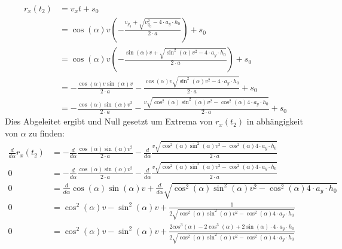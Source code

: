 \documentclass[sectionformat = aufgabe]{gadsescript}
\begin{document}
\begin{enumerate}[label=\alph*)]
		\begin{align*}
			r_x(t_2) &= v_xt + s_0\\
			~&= \cos(\alpha)v \left( - \frac{v_{y_0} + \sqrt{v_{y_0}^2 - 4\cdot a_y\cdot h_0}}{2\cdot a}\right) + s_0\\
			~&= \cos(\alpha)v \left( - \frac{\sin(\alpha)v+ \sqrt{\sin^2(\alpha)v^2 - 4\cdot a_y\cdot h_0}}{2\cdot a}\right) + s_0\\
			~&= - \frac{\cos(\alpha)v \sin(\alpha)v}{2\cdot a} - \frac{ \cos(\alpha)v \sqrt{\sin^2(\alpha)v^2 - 4\cdot a_y\cdot h_0}}{2\cdot a} + s_0\\
			~&= - \frac{\cos(\alpha)\sin(\alpha)v^2}{2\cdot a} - \frac{ v \sqrt{\cos^2(\alpha)\sin^2(\alpha)v^2 - \cos^2(\alpha)4\cdot a_y\cdot h_0}}{2\cdot a} + s_0
		\end{align*}
		Dies Abgeleitet ergibt und Null gesetzt um Extrema von $r_x(t_2)$ in abhängigkeit von $\alpha$ zu finden:
		\begin{align*}
			\frac{d}{d\alpha} r_x(t_2) &= -\frac{d}{d\alpha} \frac{\cos(\alpha)\sin(\alpha)v^2}{2\cdot a} -\frac{d}{d\alpha} \frac{ v \sqrt{\cos^2(\alpha)\sin^2(\alpha)v^2 - \cos^2(\alpha)4\cdot a_y\cdot h_0}}{2\cdot a}\\
			0 &= -\frac{d}{d\alpha} \frac{\cos(\alpha)\sin(\alpha)v^2}{2\cdot a} -\frac{d}{d\alpha} \frac{ v \sqrt{\cos^2(\alpha)\sin^2(\alpha)v^2 - \cos^2(\alpha)4\cdot a_y\cdot h_0}}{2\cdot a}\\
			0 &= \frac{d}{d\alpha} \cos(\alpha)\sin(\alpha)v + \frac{d}{d\alpha} \sqrt{\cos^2(\alpha)\sin^2(\alpha)v^2 - \cos^2(\alpha)4\cdot a_y\cdot h_0}\\
			0 &= \cos^2(\alpha)v - \sin^2(\alpha)v + \frac{1}{2 \sqrt{\cos^2(\alpha)\sin^2(\alpha)v^2 - \cos^2(\alpha)4\cdot a_y\cdot h_0}}\\
			0 &= \cos^2(\alpha)v - \sin^2(\alpha)v + \frac{2cos^3(\alpha) - 2\cos^3(\alpha) + 2\sin(\alpha) \cdot 4 \cdot a_y \cdot h_0 }{2 \sqrt{\cos^2(\alpha)\sin^2(\alpha)v^2 - \cos^2(\alpha)4\cdot a_y\cdot h_0}}\\
		\end{align*}


\end{enumerate}
\end{document}
